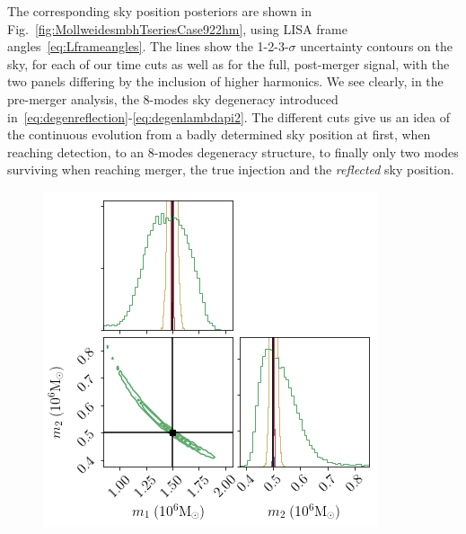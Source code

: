 \documentclass[aps,showpacs,twocolumn,prd,superscriptaddress,nofootinbib]{revtex4-1}
\begin{document}
The corresponding sky position posteriors are shown in Fig.~\ref{fig:MollweidesmbhTseriesCase922hm}, using LISA frame angles~\ref{eq:Lframeangles}. The lines show the 1-2-3-$\sigma$ uncertainty contours on the sky, for each of our time cuts as well as for the full, post-merger signal, with the two panels differing by the inclusion of higher harmonics. We see clearly, in the pre-merger analysis, the 8-modes sky degeneracy introduced in~\eqref{eq:degenreflection}-\eqref{eq:degenlambdapi2}. The different cuts give us an idea of the continuous evolution from a badly determined sky position at first, when reaching detection, to an 8-modes degeneracy structure, to finally only two modes surviving when reaching merger, the true injection and the \textit{reflected} sky position.

\begin{figure}
  \centering
  \begin{minipage}{.32\linewidth}
      \includegraphics[width=.99\linewidth]{corner_smbh_case9_hm_tseries_m1m2.png}
   \end{minipage}
   \begin{minipage}{.32\linewidth}

\end{minipage}
\end{figure}
\end{document}
